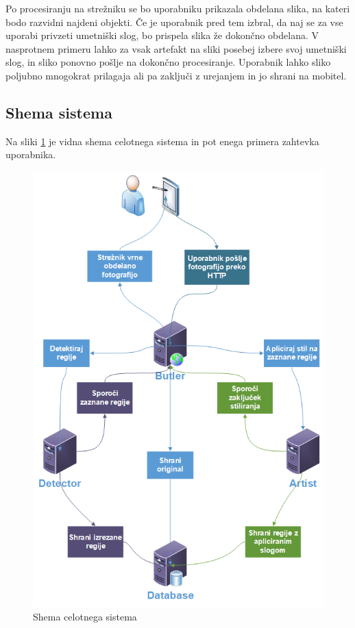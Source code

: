 \documentclass[runningheads,a4paper]{llncs}
\begin{document}
Po procesiranju na strežniku se bo uporabniku prikazala obdelana slika, na kateri bodo razvidni najdeni objekti. Če je uporabnik pred tem izbral, da naj se za vse uporabi privzeti umetniški slog, bo prispela slika že dokončno obdelana. V nasprotnem primeru lahko za vsak artefakt na sliki posebej izbere svoj umetniški slog, in sliko ponovno pošlje na dokončno procesiranje. Uporabnik lahko sliko poljubno mnogokrat prilagaja ali pa zaključi z urejanjem in jo shrani na mobitel.

\subsection{Shema sistema}
Na sliki \ref{fig:system_scheme} je vidna shema celotnega sistema in pot enega primera zahtevka uporabnika.

\begin{figure}[H]
\centering
\includegraphics[width=135mm, center]{figures/vzorec.png}
\caption{Shema celotnega sistema}
\label{fig:system_scheme}
\end{figure}



\end{document}
